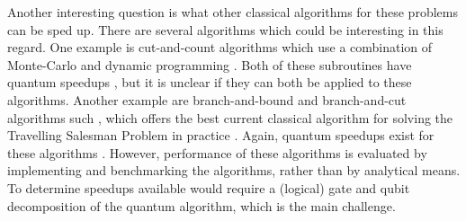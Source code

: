 Another interesting question is what other classical algorithms for these problems can be sped up. There are several algorithms which could be interesting in this regard. One example is cut-and-count algorithms which use a combination of Monte-Carlo and dynamic programming \cite{bjorklund14,bodlaender15,cygan11}. Both of these subroutines have quantum speedups \cite{montanaro2015mc, ronagh2019}, but it is unclear if they can both be applied to these algorithms. Another example are branch-and-bound and branch-and-cut algorithms such \cite{little1963, padberg1991}, which offers the best current classical algorithm for solving the Travelling Salesman Problem in practice \cite{applegate2006}. Again, quantum speedups exist for these algorithms \cite{montanaro2019}. However, performance of these algorithms is evaluated by implementing and benchmarking the algorithms, rather than by analytical means. To determine speedups available would require a (logical) gate and qubit decomposition of the quantum algorithm, which is the main challenge.
